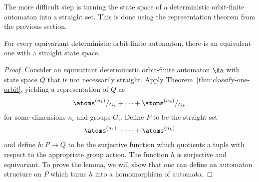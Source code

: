 The more difficult step is turning the state space of a deterministic orbit-finite automaton into a straight set. This is done using the representation theorem from the previous section. 
\begin{lemma}\label{lem:dofa-to-straight}
 For every equivariant deterministic orbit-finite automaton, there is an equivalent one with a straight state space. 
\end{lemma}
\begin{proof}
Consider an equivariant deterministic orbit-finite automaton $\Aa$ with state space $Q$ that is not necessarily straight. Apply Theorem~\ref{thm:classify-one-orbit}, yielding a representation of $Q$ as
 \begin{align*}
\atoms^{(n_1)}/_{G_1} + \cdots + \atoms^{(n_k)}/_{G_k}
\end{align*}
for some dimensions $n_i$ and groups $G_i$. Define $P$ to be the straight set
\begin{align*}
 \atoms^{(n_1)} + \cdots + \atoms^{(n_k)}
 \end{align*}
 and define $h : P \to Q$ to be the surjective function which quotients a tuple with respect to the appropriate group action. The function $h$ is surjective and equivariant. To prove the lemma, we will show that one can define an automaton structure on $P$ which turns $h$ into a homomorphism of automata. 
 

\end{proof}
